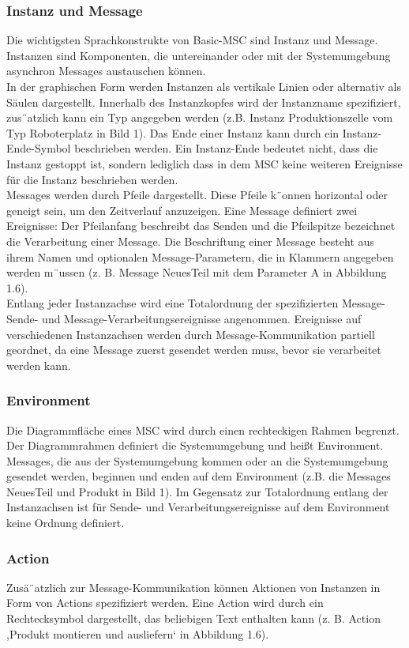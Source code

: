 \subsubsection{Instanz und Message}
Die wichtigsten Sprachkonstrukte von Basic-MSC sind Instanz
und Message. Instanzen sind Komponenten, die untereinander
oder mit der Systemumgebung asynchron Messages
austauschen können.\\
In der graphischen Form werden Instanzen als vertikale
Linien oder alternativ als Säulen dargestellt. Innerhalb
des Instanzkopfes wird der Instanzname spezifiziert,
zus¨atzlich kann ein Typ angegeben werden (z.B. Instanz
Produktionszelle vom Typ Roboterplatz in
Bild 1). Das Ende einer Instanz kann durch ein Instanz-
Ende-Symbol beschrieben werden. Ein Instanz-Ende
bedeutet nicht, dass die Instanz gestoppt ist, sondern lediglich
dass in dem MSC keine weiteren Ereignisse für die
Instanz beschrieben werden.\\
Messages werden durch Pfeile dargestellt. Diese Pfeile
k¨onnen horizontal oder geneigt sein, um den Zeitverlauf
anzuzeigen. Eine Message definiert zwei Ereignisse: Der
Pfeilanfang beschreibt das Senden und die Pfeilspitze bezeichnet
die Verarbeitung einer Message. Die Beschriftung
einer Message besteht aus ihrem Namen und optionalen
Message-Parametern, die in Klammern angegeben werden
m¨ussen (z. B. Message NeuesTeil mit dem Parameter A
in Abbildung 1.6).\\
Entlang jeder Instanzachse wird eine Totalordnung der spezifizierten
Message-Sende- und Message-Verarbeitungsereignisse
angenommen. Ereignisse auf verschiedenen Instanzachsen
werden durch Message-Kommunikation partiell
geordnet, da eine Message zuerst gesendet werden muss,
bevor sie verarbeitet werden kann.\cite{MT009}
\subsubsection{Environment}
Die Diagrammfläche eines MSC wird durch einen rechteckigen
Rahmen begrenzt. Der Diagrammrahmen definiert
die Systemumgebung und heißt Environment. Messages,
die aus der Systemumgebung kommen oder an die Systemumgebung
gesendet werden, beginnen und enden auf
dem Environment (z.B. die Messages NeuesTeil und
Produkt in Bild 1). Im Gegensatz zur Totalordnung entlang
der Instanzachsen ist für Sende- und Verarbeitungsereignisse
auf dem Environment keine Ordnung definiert.\\
\subsubsection{Action}
Zusä¨atzlich zur Message-Kommunikation können Aktionen
von Instanzen in Form von Actions spezifiziert werden.
Eine Action wird durch ein Rechtecksymbol dargestellt, das
beliebigen Text enthalten kann (z. B. Action ,Produkt
montieren und ausliefern‘ in Abbildung 1.6).\\
